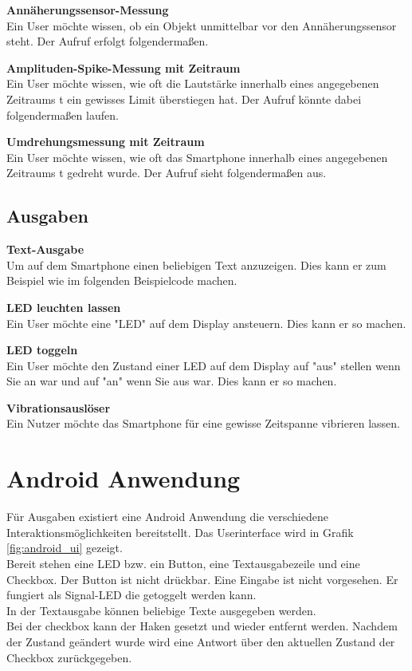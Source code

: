 \documentclass[11pt,a4paper]{report}
\begin{document}
\textbf{Annäherungssensor-Messung}\\
Ein User möchte wissen, ob ein Objekt unmittelbar vor den Annäherungssensor steht.
Der Aufruf erfolgt folgendermaßen.


\textbf{Amplituden-Spike-Messung mit Zeitraum}\\
Ein User möchte wissen, wie oft die Lautstärke innerhalb eines angegebenen Zeitraums t ein gewisses Limit überstiegen hat.
Der Aufruf könnte dabei folgendermaßen laufen.



\textbf{Umdrehungsmessung mit Zeitraum}\\
Ein User möchte wissen, wie oft das Smartphone innerhalb eines angegebenen Zeitraums t gedreht wurde.
Der Aufruf sieht folgendermaßen aus.



\subsection*{Ausgaben}\label{subsec:Ausgaben}

\textbf{Text-Ausgabe}\\
Um auf dem Smartphone einen beliebigen Text anzuzeigen.
Dies kann er zum Beispiel wie im folgenden Beispielcode machen.


\textbf{LED leuchten lassen}\\
Ein User möchte eine "LED" auf dem Display ansteuern.
Dies kann er so machen.


\textbf{LED toggeln}\\
Ein User möchte den Zustand einer LED auf dem Display auf "aus" stellen wenn Sie an war und auf "an" wenn Sie aus war.
Dies kann er so machen.


\textbf{Vibrationsauslöser}\\
Ein Nutzer möchte das Smartphone für eine gewisse Zeitspanne vibrieren lassen.


\section*{Android Anwendung}
Für Ausgaben existiert eine Android Anwendung die verschiedene Interaktionsmöglichkeiten bereitstellt.
Das Userinterface wird in Grafik \ref{fig:android_ui} gezeigt.
\\
Bereit stehen eine LED bzw. ein Button, eine Textausgabezeile und eine Checkbox.
Der Button ist nicht drückbar.
Eine Eingabe ist nicht vorgesehen.
Er fungiert als Signal-LED die getoggelt werden kann.
\\
In der Textausgabe können beliebige Texte ausgegeben werden.
\\
Bei der checkbox kann der Haken gesetzt und wieder entfernt werden.
Nachdem der Zustand geändert wurde wird eine Antwort über den aktuellen Zustand der Checkbox zurückgegeben.
\end{document}

